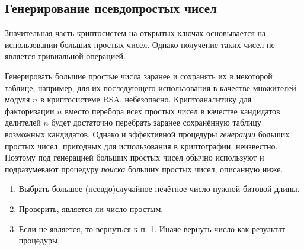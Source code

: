 \subsection{Генерирование псевдопростых чисел}\label{section-pseudo-primes-generation}

Значительная часть криптосистем на открытых ключах основывается на использовании больших простых чисел. Однако получение таких чисел не является тривиальной операцией.

Генерировать большие простые числа заранее и сохранять их в некоторой таблице, например, для их последующего использования в качестве множителей модуля $n$ в криптосистеме RSA, небезопасно. Криптоаналитику для факторизации $n$ вместо перебора всех простых чисел в качестве кандидатов делителей $n$ будет достаточно перебрать заранее сохранённую таблицу возможных кандидатов. Однако и эффективной процедуры \emph{генерации} больших простых чисел, пригодных для использования в криптографии, неизвестно. Поэтому под генерацией больших простых чисел обычно используют и подразумевают процедуру \emph{поиска} больших простых чисел, описанную ниже.

\begin{enumerate}
	\item Выбрать большое (псевдо)случайное нечётное число нужной битовой длины.
	\item Проверить, является ли число простым.
	\item Если не является, то вернуться к п. 1. Иначе вернуть число как результат процедуры.
\end{enumerate}


